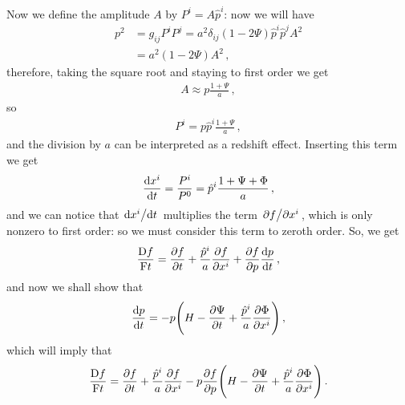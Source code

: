 \documentclass[main.tex]{subfiles}
\begin{document}
Now we define the amplitude \(A\) by \(P^{i} = A \hat{p}^{i}\): now we will have 
%
\begin{align}
p^2 &= g_{ij} P^{i} P^{j} = a^2 \delta_{ij} (1 - 2 \Psi  ) \hat{p}^{i} \hat{p}^{j} A^2  \\
&= a^2(1 -2 \Psi ) A^2
\,,
\end{align}
%
therefore, taking the square root and staying to first order we get 
%
\begin{align}
A \approx p \frac{1+\Psi }{a}
\,,
\end{align}
%
so 
%
\begin{align}
P^{i} = p \hat{p}^{i} \frac{1 + \Psi }{a}
\,,
\end{align}
%
and the division by \(a\) can be interpreted as a redshift effect. 
Inserting this term we get 
%
\begin{align}
\dv{x^{i}}{t} = \frac{P^{i}}{P^{0}} = \hat{p}^{i} \frac{1 + \Psi + \Phi }{a}
\,,
\end{align}
%
and we can notice that \(\dv*{x^{i}}{t}\) multiplies the term \(\pdv*{f}{x^{i}}\), which is only nonzero to first order: so we must consider this term to zeroth order. So, we get 
%
\begin{align}
\frac{\mathrm{D}f}{\mathrm{F}t} = \pdv{f}{t}
+ \frac{\hat{p}^{i} }{a} \pdv{f}{x^{i}}
+ \pdv{f}{p} \dv{p}{t}
\,,
\end{align}
%
and now we shall show that 
%
\begin{align}
\dv{p}{t} = - p \qty(H - \pdv{\Psi }{t} + \frac{\hat{p}^{i}}{a} \pdv{\Phi }{x^{i}})
\,,
\end{align}
%
which will imply that 
%
\begin{align}
\frac{\mathrm{D}f}{\mathrm{F}t} = \pdv{f}{t}
+ \frac{\hat{p}^{i} }{a} \pdv{f}{x^{i}}
- p \pdv{f}{p} \qty(H - \pdv{\Psi }{t} + \frac{\hat{p}^{i}}{a} \pdv{\Phi }{x^{i}})  
\,.
\end{align}
\end{document}
